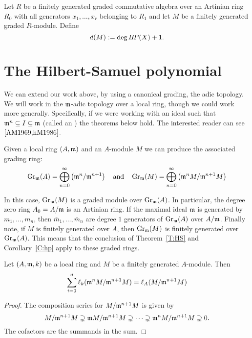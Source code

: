 \documentclass{ximera}
\begin{document}
\begin{definition}
  Let $R$ be a finitely generated graded commutative algebra over an
  Artinian ring $R_0$ with all generators $x_1,\dots,x_r$ belonging to
  $R_1$ and let $M$ be a finitely generated graded $R$-module.
  Define
  \[
  d(M) := \deg H\!P(X) + 1.
  \]
\end{definition}



\section{The Hilbert-Samuel polynomial}

We can extend our work above, by using a canonical grading, the adic
topology. We will work in the $\mathfrak{m}$-adic topology over a local ring,
though we could work more generally. Specifically, if we were working
with an ideal such that $\mathfrak{m}^n\subseteq I \subseteq \mathfrak{m}$ (called an
) the theorems below hold. The interested
reader can see $\cite{AM1969,hM1986}$.

\begin{definition}
  Given a local ring $(A,\mathfrak{m})$ and an $A$-module $M$ we can produce the
  associated grading ring:
  \[
  \operatorname{Gr}_{\mathfrak{m}}(A) = \bigoplus_{n=0}^\infty \left(\mathfrak{m}^n/\mathfrak{m}^{n+1}\right) \quad\text{and}\quad
  \operatorname{Gr}_{\mathfrak{m}}(M) = \bigoplus_{n=0}^\infty \left(\mathfrak{m}^nM/\mathfrak{m}^{n+1}M\right)
  \]
\end{definition}

In this case, $\operatorname{Gr}_{\mathfrak{m}}(M)$ is a graded module over $\operatorname{Gr}_{\mathfrak{m}}(A)$. In
particular, the degree zero ring $A_0 = A/\mathfrak{m}$ is an Artinian ring.  If
the maximal ideal $\mathfrak{m}$ is generated by $m_1,\dots,m_n$, then
$\bar{m}_1,\dots,\bar{m}_n$ are degree $1$ generators of $\operatorname{Gr}_{\mathfrak{m}}(A)$
over $A/\mathfrak{m}$. Finally note, if $M$ is finitely generated over $A$, then
$\operatorname{Gr}_{\mathfrak{m}}(M)$ is finitely generated over $\operatorname{Gr}_{\mathfrak{m}}(A)$. This means that
the conclusion of Theorem~\ref{T:HS} and Corollary~\ref{C:hp} apply to
these graded rings.

\begin{proposition}
  Let $(A,\mathfrak{m},k)$ be a local ring and $M$ be a finitely generated
  $A$-module. Then
  \[
  \sum_{i=0}^n \ell_{k}(\mathfrak{m}^n M/ \mathfrak{m}^{n+1} M) = \ell_A(M/\mathfrak{m}^{n+1} M)
  \]
  \begin{proof}
    The composition series for $M/\mathfrak{m}^{n+1} M$ is given by
    \[
    M/\mathfrak{m}^{n+1} M\supsetneq \mathfrak{m} M/\mathfrak{m}^{n+1} M \supsetneq \dots \supsetneq \mathfrak{m}^{n} M/\mathfrak{m}^{n+1} M\supsetneq  0.
    \]
    The cofactors are the summands in the sum.
  \end{proof}
\end{proposition}
\end{document}
